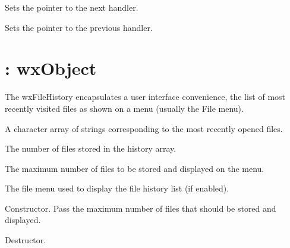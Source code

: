 
Sets the pointer to the next handler.



Sets the pointer to the previous handler.



\section{: wxObject}\label{wxfilehistory}


The wxFileHistory encapsulates a user interface convenience, the
list of most recently visited files as shown on a menu (usually the File menu).



A character array of strings corresponding to the most recently opened
files.



The number of files stored in the history array.



The maximum number of files to be stored and displayed on the menu.



The file menu used to display the file history list (if enabled).



Constructor. Pass the maximum number of files that should be stored and displayed.



Destructor.

